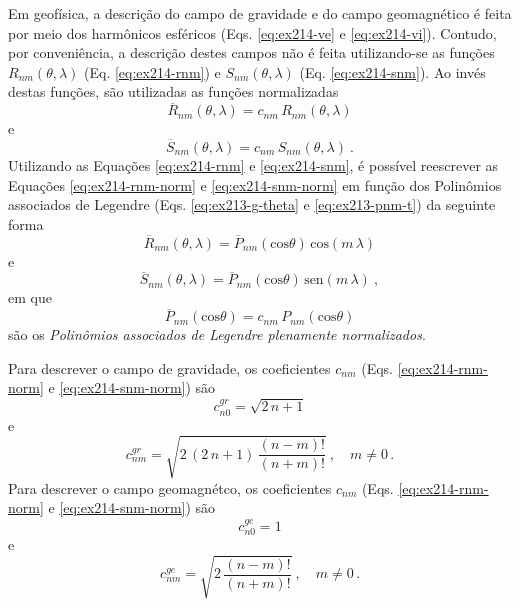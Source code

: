 \documentclass[10pt,a4paper,fleqn]{article}
\begin{document}
Em geof\'{i}sica, a descri\c{c}\~{a}o do campo de gravidade e do campo geomagn\'{e}tico \'{e} feita por
meio dos harm\^{o}nicos esf\'{e}ricos (Eqs. \ref{eq:ex214-ve} e \ref{eq:ex214-vi}). Contudo, por 
conveni\^{e}ncia, a descri\c{c}\~{a}o destes campos n\~{a}o \'{e} feita utilizando-se as fun\c{c}\~{o}es 
$R_{nm}(\theta, \lambda)$ (Eq. \ref{eq:ex214-rnm}) e $S_{nm}(\theta, \lambda)$ 
(Eq. \ref{eq:ex214-snm}). Ao inv\'{e}s destas fun\c{c}\~{o}es, s\~{a}o utilizadas as fun\c{c}\~{o}es 
normalizadas
\begin{equation}
\overline{R}_{nm}(\theta,\lambda) = c_{nm} \, R_{nm}(\theta,\lambda)
\label{eq:ex214-rnm-norm}
\end{equation}
e
\begin{equation}
\overline{S}_{nm}(\theta,\lambda) = c_{nm} \, S_{nm}(\theta,\lambda) \: .
\label{eq:ex214-snm-norm}
\end{equation}
Utilizando as Equa\c{c}\~{o}es \ref{eq:ex214-rnm} e \ref{eq:ex214-snm}, \'{e}
poss\'{i}vel reescrever as Equa\c{c}\~{o}es \ref{eq:ex214-rnm-norm} e 
\ref{eq:ex214-snm-norm} em fun\c{c}\~{a}o dos Polin\^{o}mios associados
de Legendre (Eqs. \ref{eq:ex213-g-theta} e \ref{eq:ex213-pnm-t}) da
seguinte forma
\begin{equation}
\overline{R}_{nm}(\theta,\lambda) = \overline{P}_{nm}(\text{cos}\theta) \, \text{cos}(m \, \lambda)
\label{eq:ex214-rnm-pnm-norm}
\end{equation}
e
\begin{equation}
\overline{S}_{nm}(\theta,\lambda) = \overline{P}_{nm}(\text{cos}\theta) \, \text{sen}(m \, \lambda) \: ,
\label{eq:ex214-snm-pnm-norm}
\end{equation}
em que
\begin{equation}
\overline{P}_{nm}(\text{cos}\theta) = c_{nm} \, P_{nm}(\text{cos}\theta)
\label{eq:pnm-norm}
\end{equation}
s\~{a}o os \textit{Polin\^{o}mios associados de Legendre plenamente normalizados}.

Para descrever o campo de gravidade, os coeficientes $c_{nm}$ 
(Eqs. \ref{eq:ex214-rnm-norm} e \ref{eq:ex214-snm-norm}) são 
\begin{equation}
c_{n0}^{gr} = \sqrt{2 \, n + 1}
\label{eq:ex214-cn0-grav}
\end{equation}
e
\begin{equation}
c_{nm}^{gr} = \sqrt{2 \, (2 \, n + 1) \, \dfrac{(n - m)!}{(n + m)!}} \: , \quad m \neq 0 \, .
\label{eq:ex214-cnm-grav}
\end{equation}
Para descrever o campo geomagn\'{e}tco, os coeficientes $c_{nm}$ 
(Eqs. \ref{eq:ex214-rnm-norm} e \ref{eq:ex214-snm-norm}) são 
\begin{equation}
c_{n0}^{ge} = 1
\label{eq:ex214-cn0-geom}
\end{equation}
e
\begin{equation}
c_{nm}^{ge} = \sqrt{2 \, \dfrac{(n - m)!}{(n + m)!}} \: , \quad m \neq 0 \, .
\label{eq:ex214-cnm-geom}
\end{equation}
\end{document}
